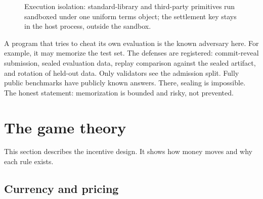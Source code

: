 \documentclass[11pt]{article}
\begin{document}
\begin{figure}[t]
\centering
{}
\caption{Execution isolation: standard-library and third-party
primitives run sandboxed under one uniform terms object; the
settlement key stays in the host process, outside the sandbox.}
\label{fig:isolation}
\end{figure}

A program that tries to cheat its own evaluation is the known
adversary here. For example, it may memorize the test set. The
defenses are registered: commit-reveal submission, sealed
evaluation data, replay comparison against the sealed artifact,
and rotation of held-out data. Only validators see the admission
split. Fully public benchmarks have publicly known answers. There,
sealing is impossible. The honest statement: memorization is
bounded and risky, not prevented.

\section{The game theory}

This section describes the incentive design. It shows how money
moves and why each rule exists.

\subsection{Currency and pricing}
\end{document}
